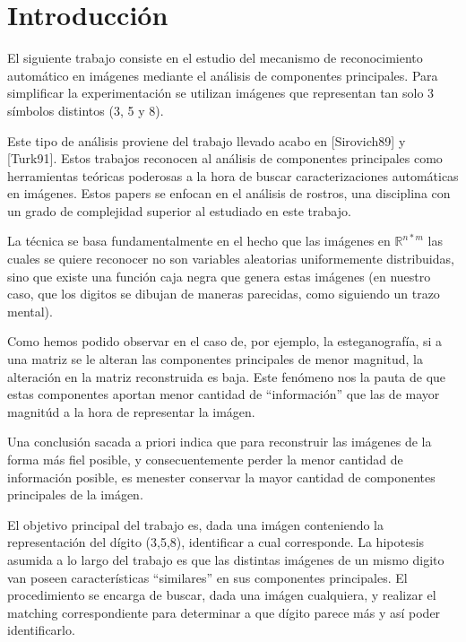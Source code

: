 \section{Introducci\'on}

El siguiente trabajo consiste en el estudio del mecanismo de reconocimiento autom\'atico 
en im\'agenes mediante el an\'alisis de componentes principales. Para simplificar la
experimentaci\'on se utilizan im\'agenes que representan tan solo 3 s\'imbolos distintos
(3, 5 y 8).

Este tipo de an\'alisis proviene del trabajo llevado acabo en [Sirovich89] y [Turk91]. Estos
trabajos reconocen al an\'alisis de componentes principales como herramientas te\'oricas poderosas
a la hora de buscar caracterizaciones autom\'aticas en im\'agenes. Estos papers se enfocan en el
an\'alisis de rostros, una disciplina con un grado de complejidad superior al estudiado en este
trabajo. 

La t\'ecnica se basa fundamentalmente en el hecho que las im\'agenes en $\mathbb{R}^{n * m}$ las cuales se
quiere reconocer no son variables aleatorias uniformemente distribuidas, sino que existe una funci\'on caja 
negra que genera estas im\'agenes (en nuestro caso, que los digitos se dibujan de maneras parecidas, 
como siguiendo un trazo mental).

Como hemos podido observar en el caso de, por ejemplo, la esteganograf\'ia, si a una matriz se le alteran
las componentes principales de menor magnitud, la alteraci\'on en la matriz reconstruida es baja. 
Este fen\'omeno nos la pauta de que estas componentes aportan menor cantidad de ``informaci\'on'' 
que las de mayor magnit\'ud a la hora de representar la im\'agen.

Una conclusi\'on sacada a priori indica que para reconstruir las im\'agenes de la forma m\'as fiel posible,
y consecuentemente perder la menor cantidad de informaci\'on posible, es menester conservar la mayor cantidad
de componentes principales de la im\'agen. 

El objetivo principal del trabajo es, dada una im\'agen conteniendo la representaci\'on del d\'igito (3,5,8), 
identificar a cual corresponde. La hipotesis asumida a lo largo del trabajo es que las distintas im\'agenes 
de un mismo digito van poseen caracter\'isticas ``similares'' en sus componentes principales. 
El procedimiento se encarga de buscar, dada una im\'agen cualquiera, y realizar el matching correspondiente 
para determinar a que d\'igito parece m\'as y as\'i poder identificarlo.

